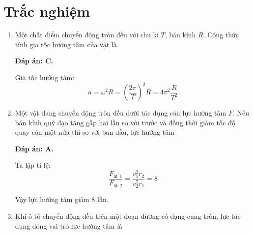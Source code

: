 \section{Trắc nghiệm}
\begin{enumerate}[label=\bfseries Câu \arabic*:]

	\item {}
	
	
	{
		Một chất điểm chuyển động tròn đều với chu kì $T$, bán kính $R$. Công thức tính gia tốc hướng tâm của vật là
	}
	
	\hideall
	{	
		\textbf{Đáp án: C.}
		
		Gia tốc hướng tâm:
		$$a=\omega^2 R = \left(\dfrac{2\pi}{T}\right)^2 R = 4 \pi ^2 \dfrac{R}{T^2}$$
	}
	\item {}
	
	
	{
		Một vật đang chuyển động tròn đều dưới tác dụng của lực hướng tâm $F$. Nếu bán kính quỹ đạo tăng gấp hai lần so với trước và đồng thời giảm tốc độ quay còn một nửa thì so với ban đầu, lực hướng tâm
	}
	
	\hideall
	{	
		\textbf{Đáp án: A.}
		
		Ta lập tỉ lệ:
		$$\dfrac{F_\text{ht 1}}{F_\text{ht 2}} = \dfrac{v_1 ^2 r_2}{v_2 ^2 r_1} = 8$$
		
		Vậy lực hướng tâm giảm 8 lần.
	}
	\item {}
	
	
	{
		Khi ô tô chuyển động đều trên một đoạn đường có dạng cung tròn, lực tác dụng đóng vai trò lực hướng tâm là
	}
	

\end{enumerate}
